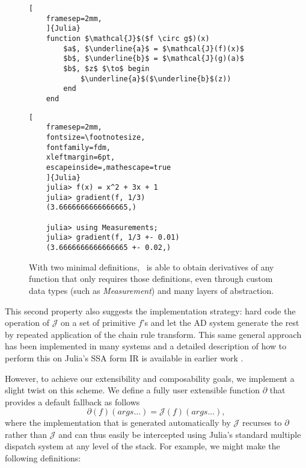 \documentclass{juliacon}
\newcommand{\Zygote}{\iftoggle{anonymous}{$\partial$P.jl}{Zygote}}
\begin{document}
\begin{figure}
    \begin{minipage}{0.5\textwidth}
    \begin{lstlisting}[
    framesep=2mm,
    ]{Julia}
    function $\mathcal{J}$($f \circ g$)(x)
        $a$, $\underline{a}$ = $\mathcal{J}(f)(x)$
        $b$, $\underline{b}$ = $\mathcal{J}(g)(a)$
        $b$, $z$ $\to$ begin
            $\underline{a}$($\underline{b}$(z))
        end
    end
    \end{lstlisting}
    \caption{The differential operator $\mathcal{J}$ is able to implement the chain rule through a local, syntactic recursive transformation.}\label{chain}
    \end{minipage}
    \hspace{0.1in}
    \begin{minipage}{0.5\textwidth}
    \begin{lstlisting}[
    framesep=2mm,
    fontsize=\footnotesize,
    fontfamily=fdm,
    xleftmargin=6pt,
    escapeinside=,mathescape=true
    ]{Julia}
    julia> f(x) = x^2 + 3x + 1
    julia> gradient(f, 1/3)
    (3.6666666666666665,)
    
    julia> using Measurements;
    julia> gradient(f, 1/3 +- 0.01)
    (3.6666666666666665 +- 0.02,)
    \end{lstlisting}
    \caption{With two minimal definitions, \Zygote\ is able to obtain derivatives of any function that only requires those definitions, even through custom data types (such as \textit{Measurement}) and many layers of abstraction.}\label{generalize}
    \end{minipage}
\end{figure}

    This second property also suggests the implementation strategy: hard code the operation of $\mathcal{J}$ on a set of primitive $f$'s and let the AD system generate the rest by repeated application of the chain rule transform. This same general approach has been implemented in many systems \cite{pearlmutter2008reverse,wang2018demystifying} and a  detailed description of how to perform this on Julia's SSA form IR is available in earlier work \cite{Zygote.jl-2018}.

    However, to achieve our extensibility and composability goals, we implement a slight twist on this scheme. We define a fully user extensible function $\partial$ that provides a default fallback as follows
\[
\partial(f)(args...) = \mathcal{J}(f)(args...),
\]
    where the implementation that is generated automatically by $\mathcal{J}$ recurses to $\partial$ rather than $\mathcal{J}$ and can thus easily be intercepted using Julia's standard multiple dispatch system at any level of the stack. For example, we might make the following definitions:
\end{document}
